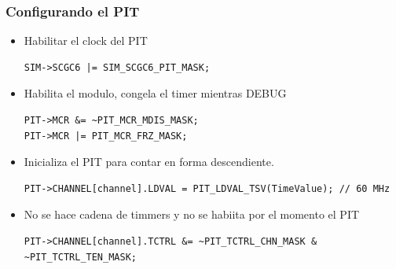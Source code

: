 \documentclass[10.5pt,scale=1.0,t,aspectratio=169,hyperref={pdfpagelabels=false}]{beamer}
\begin{document}
\begin{frame}[fragile]
	\frametitle{Configurando el PIT}
	{\small
		\begin{itemize}
			\setlength\itemsep{0em}
			\item Habilitar el clock del PIT
			\begin{lstlisting}[style=CStyle]
SIM->SCGC6 |= SIM_SCGC6_PIT_MASK;				
			\end{lstlisting}
			\item Habilita el modulo, congela el timer mientras DEBUG
			\begin{lstlisting}[style=CStyle]
PIT->MCR &= ~PIT_MCR_MDIS_MASK;
PIT->MCR |= PIT_MCR_FRZ_MASK;			
			\end{lstlisting}
			\item Inicializa el PIT para contar en forma descendiente.
			\begin{lstlisting}[style=CStyle]
PIT->CHANNEL[channel].LDVAL = PIT_LDVAL_TSV(TimeValue); // 60 MHz
			\end{lstlisting}
			\item No se hace cadena de timmers y no se habiita por el momento el PIT
			\begin{lstlisting}[style=CStyle]
PIT->CHANNEL[channel].TCTRL &= ~PIT_TCTRL_CHN_MASK & ~PIT_TCTRL_TEN_MASK;			
			\end{lstlisting}
		\end{itemize}
	}
\end{frame}
\end{document}
